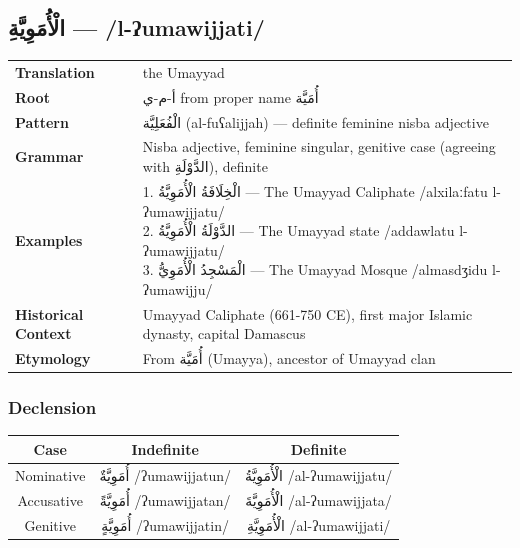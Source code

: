 \documentclass[letterpaper,12pt]{article}
\begin{document}
\subsection{\textarabic{الْأُمَوِيَّةِ} — /l-ʔumawijjati/}
\begin{tabular}{p{3cm}p{10cm}}
\toprule
\textbf{Translation} & the Umayyad \\
\textbf{Root} & \textarabic{أ-م-ي} from proper name \textarabic{أُمَيَّة} \\
\textbf{Pattern} & \textarabic{الْفُعَلِيَّة} (al-fuʕalijjah) — definite feminine nisba adjective \\
\textbf{Grammar} & Nisba adjective, feminine singular, genitive case (agreeing with \textarabic{الدَّوْلَةِ}), definite \\
\midrule
\textbf{Examples} & \makecell[l]{\parbox{9.5cm}{
1. \textarabic{الْخِلَافَةُ الْأُمَوِيَّةُ} — The Umayyad Caliphate /alxilaːfatu l-ʔumawijjatu/\\
2. \textarabic{الدَّوْلَةُ الْأُمَوِيَّةُ} — The Umayyad state /addawlatu l-ʔumawijjatu/\\
3. \textarabic{الْمَسْجِدُ الْأُمَوِيُّ} — The Umayyad Mosque /almasdʒidu l-ʔumawijju/
}} \\
\midrule
\textbf{Historical Context} & Umayyad Caliphate (661-750 CE), first major Islamic dynasty, capital Damascus \\
\textbf{Etymology} & From \textarabic{أُمَيَّة} (Umayya), ancestor of Umayyad clan \\
\bottomrule
\end{tabular}

\subsubsection*{Declension}
\begin{tabular}{|c|c|c|}
\hline
\textbf{Case} & \textbf{Indefinite} & \textbf{Definite} \\
\hline
Nominative & \textarabic{أُمَوِيَّةٌ} /ʔumawijjatun/ & \textarabic{الْأُمَوِيَّةُ} /al-ʔumawijjatu/ \\
\hline
Accusative & \textarabic{أُمَوِيَّةً} /ʔumawijjatan/ & \textarabic{الْأُمَوِيَّةَ} /al-ʔumawijjata/ \\
\hline
Genitive & \textarabic{أُمَوِيَّةٍ} /ʔumawijjatin/ & \textarabic{الْأُمَوِيَّةِ} /al-ʔumawijjati/ \\
\hline
\end{tabular}

\end{document}

